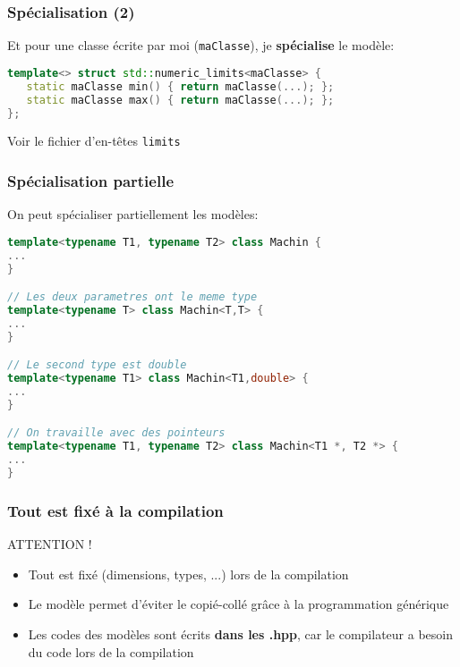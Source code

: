 \documentclass{beamer}
\begin{document}
\begin{frame}[fragile=singleslide,shrink=20]
\frametitle {Spécialisation (2)}

Et pour une classe écrite par moi (\texttt{maClasse}), je \textbf{spécialise} le modèle:

\begin{lstlisting}[language=c++]
template<> struct std::numeric_limits<maClasse> {
   static maClasse min() { return maClasse(...); };
   static maClasse max() { return maClasse(...); };
};
\end{lstlisting}

Voir le fichier d'en-têtes \texttt{limits}

\end{frame}

\begin{frame}[fragile=singleslide,shrink=20]
\frametitle {Spécialisation partielle}

On peut spécialiser partiellement les modèles:

\begin{lstlisting}[language=c++]
template<typename T1, typename T2> class Machin {
...
}

// Les deux parametres ont le meme type
template<typename T> class Machin<T,T> {
...
}

// Le second type est double
template<typename T1> class Machin<T1,double> {
...
}

// On travaille avec des pointeurs
template<typename T1, typename T2> class Machin<T1 *, T2 *> {
...
}
\end{lstlisting}

\end{frame}

\begin{frame}
\frametitle {Tout est fixé à la compilation}

\begin{block}{ATTENTION !}
\begin{itemize}
\item{Tout est fixé (dimensions, types, ...) lors de la compilation}
\item{Le modèle permet d'éviter le copié-collé grâce à la programmation générique}
\item{Les codes des modèles sont écrits \textbf{dans les .hpp}, car le compilateur a besoin du code lors de la compilation}
\end{itemize}
\end{block}

\end{frame}
\end{document}
